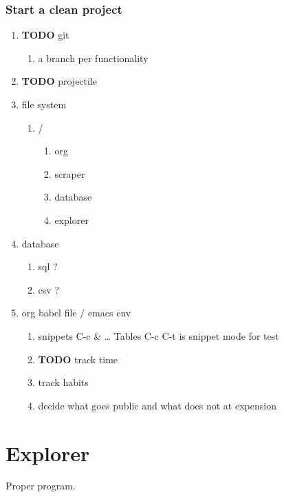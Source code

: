 \documentclass[11pt]{article}
\begin{document}
\subsubsection{Start a clean project}
\label{sec:orgdd4c535}
\begin{enumerate}
\item {\bfseries\sffamily TODO} git
\label{sec:orgc0f0156}
\begin{enumerate}
\item a branch per functionality
\label{sec:orgc7f3440}
\end{enumerate}
\item {\bfseries\sffamily TODO} projectile
\label{sec:orge84c594}
\item file system
\label{sec:org11fe25d}
\begin{enumerate}
\item /
\label{sec:orgbb2ce02}
\begin{enumerate}
\item org
\label{sec:org6b0e0bc}
\item scraper
\label{sec:orgfe16469}
\item database
\label{sec:orgb9dfdcd}
\item explorer
\label{sec:org48a93ac}
\end{enumerate}
\end{enumerate}
\item database
\label{sec:org35dc1bd}
\begin{enumerate}
\item sql ?
\label{sec:orga3fdb89}
\item csv ?
\label{sec:orgeaccb63}
\end{enumerate}
\item org babel file / emacs env
\label{sec:orgad61787}
\begin{enumerate}
\item snippets
\label{sec:orga7a6f57}
C-c \& \ldots{}
Tables
C-c C-t is snippet mode for test
\item {\bfseries\sffamily TODO} track time
\label{sec:org5f4007e}
\item track habits
\label{sec:org941eaae}
\item decide what goes public and what does not at expension
\label{sec:org497a888}
\end{enumerate}
\end{enumerate}
\section{Explorer}
\label{sec:org961d6b8}
Proper program.
\end{document}
